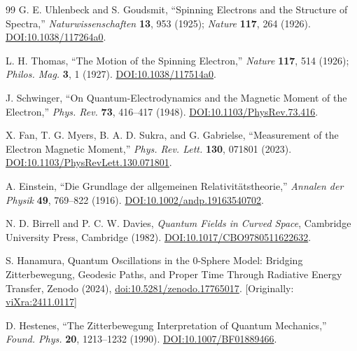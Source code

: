 \documentclass[%
 reprint,
 amsmath,amssymb,
 aps,
]{revtex4-1}
\numberwithin{equation}{section}%
\begin{document}
\begin{thebibliography}{99}
G. E. Uhlenbeck and S. Goudsmit,
``Spinning Electrons and the Structure of Spectra,''
\textit{Naturwissenschaften} \textbf{13}, 953 (1925);
\textit{Nature} \textbf{117}, 264 (1926).
\href{https://doi.org/10.1038/117264a0}{DOI:10.1038/117264a0}.

L. H. Thomas,
``The Motion of the Spinning Electron,''
\textit{Nature} \textbf{117}, 514 (1926);
\textit{Philos. Mag.} \textbf{3}, 1 (1927).
\href{https://doi.org/10.1038/117514a0}{DOI:10.1038/117514a0}.

J. Schwinger,
``On Quantum-Electrodynamics and the Magnetic Moment of the Electron,''
\textit{Phys. Rev.} \textbf{73}, 416--417 (1948).
\href{https://doi.org/10.1103/PhysRev.73.416}{DOI:10.1103/PhysRev.73.416}.

X. Fan, T. G. Myers, B. A. D. Sukra, and G. Gabrielse,
``Measurement of the Electron Magnetic Moment,''
\textit{Phys. Rev. Lett.} \textbf{130}, 071801 (2023).
\href{https://doi.org/10.1103/PhysRevLett.130.071801}{DOI:10.1103/PhysRevLett.130.071801}.

A. Einstein,
``Die Grundlage der allgemeinen Relativitätstheorie,''
\textit{Annalen der Physik} \textbf{49}, 769--822 (1916).
\href{https://doi.org/10.1002/andp.19163540702}{DOI:10.1002/andp.19163540702}.

N. D. Birrell and P. C. W. Davies,
\textit{Quantum Fields in Curved Space},
Cambridge University Press, Cambridge (1982).
\href{https://doi.org/10.1017/CBO9780511622632}{DOI:10.1017/CBO9780511622632}.

S. Hanamura, Quantum Oscillations in the 0-Sphere Model: Bridging Zitterbewegung, Geodesic Paths, and Proper Time Through Radiative Energy Transfer, Zenodo (2024), \href{https://doi.org/10.5281/zenodo.17765017}{doi:10.5281/zenodo.17765017}. [Originally: \href{https://vixra.org/abs/2411.0117}{viXra:2411.0117}]

D. Hestenes,
``The Zitterbewegung Interpretation of Quantum Mechanics,''
\textit{Found. Phys.} \textbf{20}, 1213--1232 (1990).
\href{https://doi.org/10.1007/BF01889466}{DOI:10.1007/BF01889466}.


\end{thebibliography}
\end{document}
